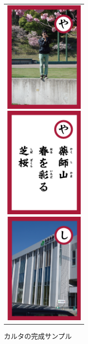 \begin{figure}[htbp]
  \begin{center}
    \begin{tabular}{c}

      \begin{minipage}{0.33\hsize}
        \begin{center}
\includegraphics[width=4cm, bb=0 0 320 552]{karuta1.png}
        \end{center}
      \end{minipage}

      \begin{minipage}{0.33\hsize}
        \begin{center}
\includegraphics[width=4cm, bb=0 0 321 547]{karuta3.png}
        \end{center}
      \end{minipage}

      \begin{minipage}{0.33\hsize}
        \begin{center}
\includegraphics[width=4cm, bb=0 0 320 548]{karuta2.png}
        \end{center}
      \end{minipage}

    \end{tabular}
  \end{center}
\addtocounter{figure}{+0}
 \caption{カルタの完成サンプル}
\end{figure}

